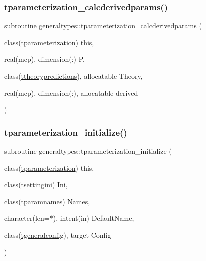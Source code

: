 \subsubsection{\texorpdfstring{tparameterization\+\_\+calcderivedparams()}{tparameterization\_calcderivedparams()}}
{\footnotesize\ttfamily subroutine generaltypes\+::tparameterization\+\_\+calcderivedparams (\begin{DoxyParamCaption}\item[{class(\mbox{\hyperlink{structgeneraltypes_1_1tparameterization}{tparameterization}})}]{this,  }\item[{real(mcp), dimension(\+:)}]{P,  }\item[{class(\mbox{\hyperlink{structgeneraltypes_1_1ttheorypredictions}{ttheorypredictions}}), allocatable}]{Theory,  }\item[{real(mcp), dimension(\+:), allocatable}]{derived }\end{DoxyParamCaption})\hspace{0.3cm}{\ttfamily [private]}}

\mbox{\label{namespacegeneraltypes_a3ebde3fdac358126f25e067d6b223de1}} 
\subsubsection{\texorpdfstring{tparameterization\+\_\+initialize()}{tparameterization\_initialize()}}
{\footnotesize\ttfamily subroutine generaltypes\+::tparameterization\+\_\+initialize (\begin{DoxyParamCaption}\item[{class(\mbox{\hyperlink{structgeneraltypes_1_1tparameterization}{tparameterization}})}]{this,  }\item[{class(tsettingini)}]{Ini,  }\item[{class(tparamnames)}]{Names,  }\item[{character(len=$\ast$), intent(in)}]{Default\+Name,  }\item[{class(\mbox{\hyperlink{structgeneraltypes_1_1tgeneralconfig}{tgeneralconfig}}), target}]{Config }\end{DoxyParamCaption})\hspace{0.3cm}{\ttfamily [private]}}

\mbox{\label{namespacegeneraltypes_a21288f1eff4120ed86e9b0bfce3eed50}} 
